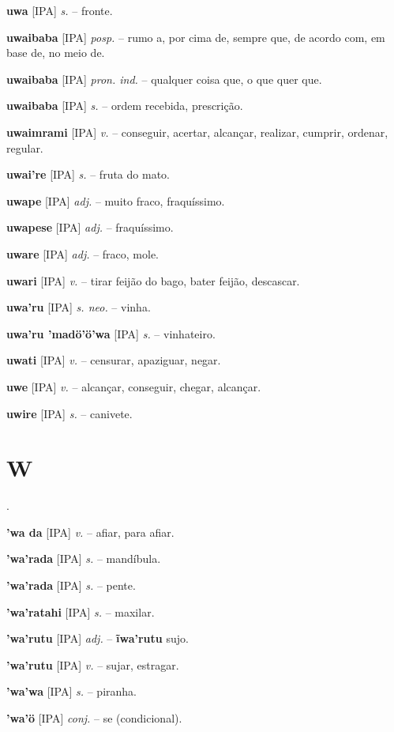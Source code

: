 \textbf{uwa} [IPA] \textit{s.} -- fronte.

\textbf{uwaibaba} [IPA] \textit{posp.} -- rumo a, por cima de, sempre que, de acordo com, em base de, no meio de.

\textbf{uwaibaba} [IPA] \textit{pron. ind.} -- qualquer coisa que, o que quer que.

\textbf{uwaibaba} [IPA] \textit{s.} -- ordem recebida, prescrição.

\textbf{uwaimrami} [IPA] \textit{v.} -- conseguir, acertar, alcançar, realizar, cumprir, ordenar, regular.

\textbf{uwai're} [IPA] \textit{s.} -- fruta do mato.

\textbf{uwape} [IPA] \textit{adj.} -- muito fraco, fraquíssimo.

\textbf{uwapese} [IPA] \textit{adj.} -- fraquíssimo.

\textbf{uware} [IPA] \textit{adj.} -- fraco, mole.

\textbf{uwari} [IPA] \textit{v.} -- tirar feijão do bago, bater feijão, descascar.

\textbf{uwa'ru} [IPA] \textit{s. neo.} -- vinha.

\textbf{uwa'ru 'madö'ö'wa} [IPA] \textit{s.} -- vinhateiro.

\textbf{uwati} [IPA] \textit{v.} -- censurar, apaziguar, negar.

\textbf{uwe} [IPA] \textit{v.} -- alcançar, conseguir, chegar, alcançar.

\textbf{uwire} [IPA] \textit{s.} -- canivete.


\section*{W}.


\textbf{'wa da} [IPA] \textit{v.} -- afiar, para afiar.

\textbf{'wa'rada} [IPA] \textit{s.} -- mandíbula.

\textbf{'wa'rada} [IPA] \textit{s.} -- pente.

\textbf{'wa'ratahi} [IPA] \textit{s.} -- maxilar.

\textbf{'wa'rutu} [IPA] \textit{adj.} -- \textbf{ĩwa'rutu} sujo.

\textbf{'wa'rutu} [IPA] \textit{v.} -- sujar, estragar.

\textbf{'wa'wa} [IPA] \textit{s.} -- piranha.

\textbf{'wa'ö} [IPA] \textit{conj.} -- se (condicional).

